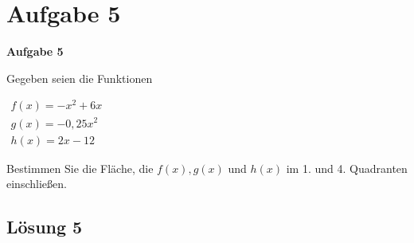 \documentclass[main.tex]{subfiles}
\begin{document}
\section{Aufgabe 5}
\textbf{Aufgabe 5}

Gegeben seien die Funktionen

$ \begin{array}{l}
f( x) =-x^{2} +6x\\
g( x) =-0,25x^{2}\\
h( x) =2x-12
\end{array}$

Bestimmen Sie die Fläche, die $f(x), g(x)$ und $h(x)$ im 1. und 4. Quadranten einschließen.

\subsection{Lösung 5}
\end{document}
